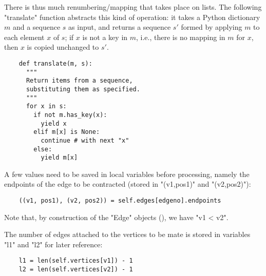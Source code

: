There is thus much renumbering/mapping that takes place on
lists. The following "translate" function abstracts this kind of
operation: it takes a Python dictionary $m$
and a sequence $s$ as input, and returns a sequence $s'$ formed by
applying $m$ to each element $x$ of $s$; if $x$ is not a key in $m$,
i.e., there is no mapping in $m$ for $x$, then $x$ is copied unchanged
to $s'$.  
\begin{lstlisting}
    def translate(m, s):
      """
      Return items from a sequence, 
      substituting them as specified.
      """
      for x in s:
        if not m.has_key(x):
          yield x
        elif m[x] is None:
          continue # with next "x"
        else:
          yield m[x]
\end{lstlisting}

A few values need to be saved in local variables before processing,
namely the endpoints of the edge to be contracted (stored in
"(v1,pos1)" and "(v2,pos2)"):
\begin{lstlisting}
    ((v1, pos1), (v2, pos2)) = self.edges[edgeno].endpoints

\end{lstlisting}
Note that, by construction of the "Edge" objects (),
we have "v1 < v2".

The number of edges attached to the vertices to be mate is stored in
variables "l1" and "l2" for later reference:
\begin{lstlisting}
    l1 = len(self.vertices[v1]) - 1
    l2 = len(self.vertices[v2]) - 1

\end{lstlisting}

